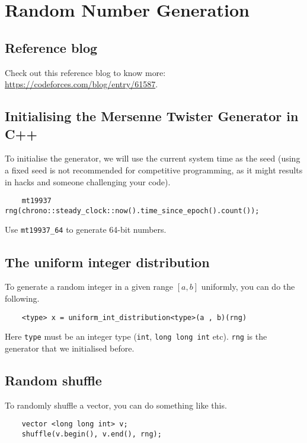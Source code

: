 \documentclass[12pt,a4paper]{amsart}
\numberwithin{equation}{section}
\theoremstyle{definition}
\begin{document}
\section{Random Number Generation}
\subsection{Reference blog} Check out this reference blog to know more: \url{https://codeforces.com/blog/entry/61587}. 

\subsection{Initialising the Mersenne Twister Generator in C++} To initialise the generator, we will use the current system time as the seed (using a fixed seed is not recommended for competitive programming, as it might results in hacks and someone challenging your code). 
\begin{lstlisting}
    mt19937 rng(chrono::steady_clock::now().time_since_epoch().count());
\end{lstlisting}
Use \verb|mt19937_64| to generate 64-bit numbers. 

\subsection{The uniform integer distribution} To generate a random integer in a given range $[a , b]$ uniformly, you can do the following. 
\begin{lstlisting}
    <type> x = uniform_int_distribution<type>(a , b)(rng)
\end{lstlisting}
Here \verb|type| must be an integer type (\verb|int|, \verb|long long int| etc). \verb|rng| is the generator that we initialised before. 

\subsection{Random shuffle} To randomly shuffle a vector, you can do something like this. 
\begin{lstlisting}
    vector <long long int> v;
    shuffle(v.begin(), v.end(), rng);
\end{lstlisting}
\end{document}

